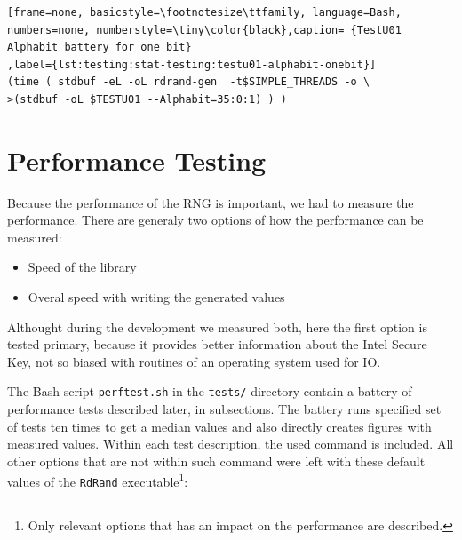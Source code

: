 \begin{lstlisting}[frame=none, basicstyle=\footnotesize\ttfamily, language=Bash, numbers=none, numberstyle=\tiny\color{black},caption= {TestU01 Alphabit battery for one bit}
,label={lst:testing:stat-testing:testu01-alphabit-onebit}]
(time ( stdbuf -eL -oL rdrand-gen  -t$SIMPLE_THREADS -o \
>(stdbuf -oL $TESTU01 --Alphabit=35:0:1) ) ) 
\end{lstlisting}



\section{Performance Testing} \label{sec:testing:performance-testing}
Because the performance of the RNG is important, we had to measure the performance. There are generaly two options of how the performance can be measured:
\begin{itemize}
 \item Speed of the library
 \item Overal speed with writing the generated values
\end{itemize}
Althought during the development we measured both, here the first option is tested primary, because it provides better information about the Intel Secure Key, not so biased with routines of an operating system used for IO. 


\par {} %

The Bash script {\tt perftest.sh} in the {\tt tests/} directory contain a battery of performance tests described later, in subsections. The battery runs specified set of tests ten times to get a median values and also directly creates figures with measured values. Within each test description, the used command is included. All other options that are not within such command were left with these default values of the {\tt RdRand} executable\footnote{Only relevant options that has an impact on the performance are described.}:

